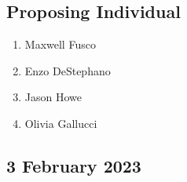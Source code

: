 \begin{enumerate}
            \subsection{Proposing Individual}
            \begin{enumerate}
                  \item Maxwell Fusco
                  \item Enzo DeStephano
                  \item Jason Howe
                  \item Olivia Gallucci
            \end{enumerate}
\end{enumerate}

\subsection{3 February 2023}
